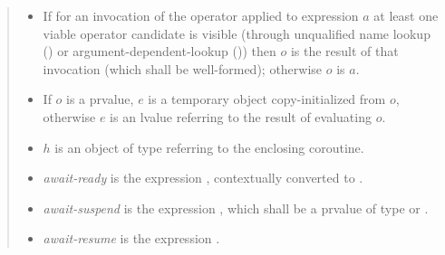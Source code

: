\begin{quote}
\begin{itemize}
\item If for an invocation of the operator  applied to expression $a$ at least one viable operator  candidate is visible 
(through unqualified name lookup () or argument-dependent-lookup ())
then $o$ is the result of that invocation (which shall be well-formed); otherwise $o$ is $a$.
%
  \item If $o$ is a prvalue, $e$ is a temporary object copy-initialized from $o$, otherwise $e$ is an lvalue referring to the result of evaluating $o$.
  
  \item $h$ is an object of type  referring to the enclosing coroutine.
  \item \textit{await-ready} is the expression , contextually converted to .
  \item \textit{await-suspend} is the expression , which shall be a prvalue of type  or .
  \item \textit{await-resume} is the expression .
\end{itemize}


\end{quote}
